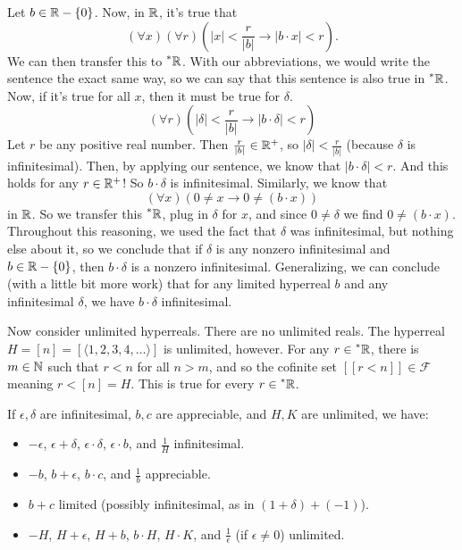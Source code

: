 Let $b \in \mathbb{R} - \{0\}$. Now, in $\mathbb{R}$, it's true that
\[
(\forall x)(\forall r)(|x| < \frac{r}{|b|} \to |b \cdot x| < r).
\] 
We can then transfer this to $\prescript{*}{}{\mathbb{R}}$. With our abbreviations, we would write the sentence the exact same way, so we can say that this sentence is also true in $\prescript{*}{}{\mathbb{R}}$. Now, if it's true for all $x$, then it must be true for $\delta$.
\[
(\forall r)(|\delta| < \frac{r}{|b|} \to |b \cdot \delta| < r)
\]
Let $r$ be any positive real number. Then $\frac{r}{|b|} \in \mathbb{R}^+$, so $|\delta| < \frac{r}{|b|}$ (because $\delta$ is infinitesimal). Then, by applying our sentence, we know that $|b \cdot \delta| < r$. And this holds for any $r \in \mathbb{R}^+$! So $b \cdot \delta$ is infinitesimal. Similarly, we know that
\[
(\forall x)(0 \neq x \to 0 \neq (b \cdot x))
\]
in $\mathbb{R}$. So we transfer this $\prescript{*}{}{\mathbb{R}}$, plug in $\delta$ for $x$, and since $0 \neq \delta$ we find $0 \neq (b \cdot x)$. Throughout this reasoning, we used the fact that $\delta$ was infinitesimal, but nothing else about it, so we conclude that if $\delta$ is any nonzero infinitesimal and $b \in \mathbb{R} - \{0\}$, then $b \cdot \delta$ is a nonzero infinitesimal. Generalizing, we can conclude (with a little bit more work) that for any limited hyperreal $b$ and any infinitesimal $\delta$, we have $b \cdot \delta$ infinitesimal.

Now consider unlimited hyperreals. There are no unlimited reals. The hyperreal $H = [n] = [\langle 1, 2, 3, 4, \ldots \rangle]$ is unlimited, however. For any $r \in \prescript{*}{}{\mathbb{R}}$, there is $m \in \mathbb{N}$ such that $r < n$ for all $n > m$, and so the cofinite set $[[r < n]] \in \mathcal{F}$ meaning $r < [n] = H$. This is true for every $r \in \prescript{*}{}{\mathbb{R}}$.

\begin{thm}\label{arithmeticHyperreals}
    If $\epsilon, \delta$ are infinitesimal, $b, c$ are appreciable, and $H, K$ are unlimited, we have:
    \begin{itemize}
        \item $-\epsilon$, $\epsilon + \delta$, $\epsilon \cdot \delta$, $\epsilon \cdot b$, and $\frac{1}{H}$ infinitesimal.
        \item $-b$, $b + \epsilon$, $b \cdot c$, and $\frac{1}{b}$ appreciable.
        \item $b + c$ limited (possibly infinitesimal, as in $(1 + \delta) + (-1)$).
        \item $-H$, $H + \epsilon$, $H + b$, $b \cdot H$, $H \cdot K$, and $\frac{1}{\epsilon}$ (if $\epsilon \neq 0$) unlimited.
    \end{itemize}
\end{thm}


